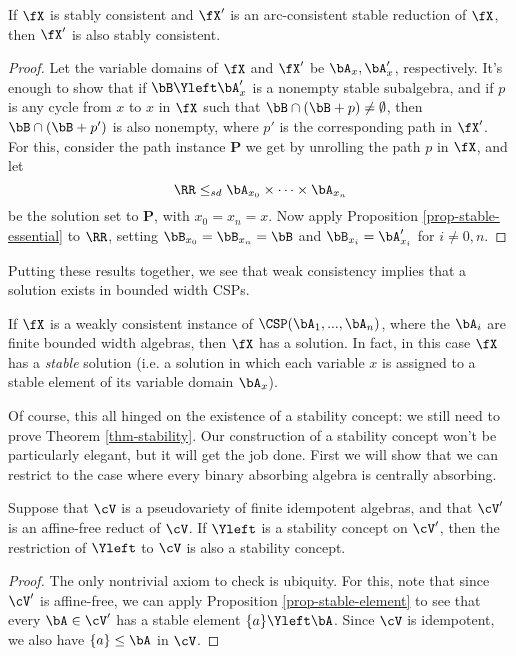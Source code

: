 \begin{lem} If $\fX$ is stably consistent and $\fX'$ is an arc-consistent stable reduction of $\fX$, then $\fX'$ is also stably consistent.
\end{lem}
\begin{proof} Let the variable domains of $\fX$ and $\fX'$ be $\bA_x, \bA_x'$, respectively. It's enough to show that if $\bB \Yleft \bA_x'$ is a nonempty stable subalgebra, and if $p$ is any cycle from $x$ to $x$ in $\fX$ such that $\bB \cap (\bB + p) \ne \emptyset$, then $\bB \cap (\bB + p')$ is also nonempty, where $p'$ is the corresponding path in $\fX'$. For this, consider the path instance $\mathbf{P}$ we get by unrolling the path $p$ in $\fX$, and let
\[
\RR \le_{sd} \bA_{x_0} \times \cdots \times \bA_{x_n}
\]
be the solution set to $\mathbf{P}$, with $x_0 = x_n = x$. Now apply Proposition \ref{prop-stable-essential} to $\RR$, setting $\bB_{x_0} = \bB_{x_n} = \bB$ and $\bB_{x_i} = \bA_{x_i}'$ for $i \ne 0,n$.
\end{proof}

Putting these results together, we see that weak consistency implies that a solution exists in bounded width CSPs.

\begin{thm} If $\fX$ is a weakly consistent instance of $\CSP(\bA_1, ..., \bA_n)$, where the $\bA_i$ are finite bounded width algebras, then $\fX$ has a solution. In fact, in this case $\fX$ has a \emph{stable} solution (i.e. a solution in which each variable $x$ is assigned to a stable element of its variable domain $\bA_x$).
\end{thm}

Of course, this all hinged on the existence of a stability concept: we still need to prove Theorem \ref{thm-stability}. Our construction of a stability concept won't be particularly elegant, but it will get the job done. First we will show that we can restrict to the case where every binary absorbing algebra is centrally absorbing.

\begin{prop} Suppose that $\cV$ is a pseudovariety of finite idempotent algebras, and that $\cV'$ is an affine-free reduct of $\cV$. If $\Yleft$ is a stability concept on $\cV'$, then the restriction of $\Yleft$ to $\cV$ is also a stability concept.
\end{prop}
\begin{proof} The only nontrivial axiom to check is ubiquity. For this, note that since $\cV'$ is affine-free, we can apply Proposition \ref{prop-stable-element} to see that every $\bA \in \cV'$ has a stable element $\{a\} \Yleft \bA$. Since $\cV$ is idempotent, we also have $\{a\} \le \bA$ in $\cV$.
\end{proof}

